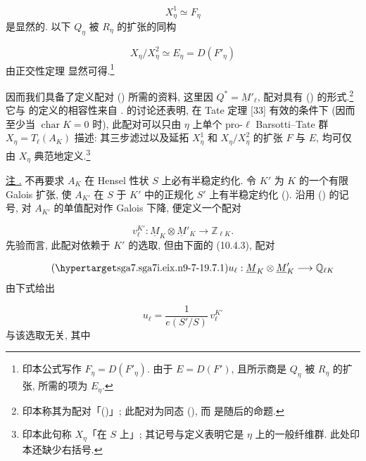\begin{equation*}
X^1_\eta\simeq F_\eta
\end{equation*}
是显然的. 以下 $Q_\eta$ 被 $R_\eta$ 的扩张的同构

\begin{equation*}
X_\eta/X^2_\eta\simeq E_\eta=D(F'_\eta)
\end{equation*}
由正交性定理  显然可得.\footnote{印本公式写作 $F_\eta=D(F'_\eta)$. 由于 $E=D(F')$, 且所示商是 $Q_\eta$ 被 $R_\eta$ 的扩张, 所需的项为 $E_\eta$.}

因而我们具备了定义配对 () 所需的资料, 这里因 $Q^*=\underline M'_\ell$, 配对具有 () 的形式.\footnote{印本称其为配对「()」; 此配对为同态 (), 而  是随后的命题.} 它与  的定义的相容性来自 .  的讨论还表明, 在 Tate 定理 [33] 有效的条件下 (因而至少当 $\operatorname{char}K=0$ 时), 此配对可以只由 $\eta$ 上单个 pro-$\ell$ Barsotti--Tate 群 $X_\eta=T_\ell(A_K)$ 描述: 其三步滤过以及延拓 $X^1_\eta$ 和 $X_\eta/X^2_\eta$ 的扩张 $F$ 与 $E$, 均可仅由 $X_\eta$ 典范地定义.\footnote{印本此句称 $X_\eta$「在 $S$ 上」; 其记号与定义表明它是 $\eta$ 上的一般纤维群. 此处印本还缺少右括号.}

\medskip
\noindent
\underline{注 .} 不再要求 $A_K$ 在 Hensel 性状 $S$ 上必有半稳定约化. 令 $K'$ 为 $K$ 的一个有限 Galois 扩张, 使 $A_{K'}$ 在 $S$ 于 $K'$ 中的正规化 $S'$ 上有半稳定约化 (). 沿用 () 的记号, 对 $A_{K'}$ 的单值配对作 Galois 下降, 便定义一个配对

\begin{equation}\tag{*}
v_\ell^{K'}:\underline M_K\otimes\underline M'_K
 \longrightarrow\mathbb Z_{\ell K}.
\end{equation}
先验而言, 此配对依赖于 $K'$ 的选取, 但由下面的 (10.4.3), 配对

\begin{equation}\tag{\SGARefTarget{sga7.sga7i.eix.n9-7-1}{9.7.1}}
u_\ell:\underline M_K\otimes\underline M'_K
 \longrightarrow\mathbb Q_{\ell K}
\end{equation}
由下式给出

\begin{equation*}
u_\ell=\frac{1}{e(S'/S)}\,v_\ell^{K'}
\end{equation*}
与该选取无关, 其中

